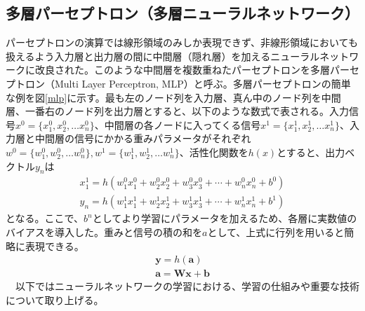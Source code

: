 \subsection{多層パーセプトロン（多層ニューラルネットワーク）}
パーセプトロンの演算では線形領域のみしか表現できず、非線形領域においても扱えるよう入力層と出力層の間に中間層（隠れ層）を加えるニューラルネットワークに改良された。このような中間層を複数重ねたパーセプトロンを多層パーセプトロン（Multi Layer Perceptron, MLP）と呼ぶ。多層パーセプトロンの簡単な例を図\ref{mlp}に示す。最も左のノード列を入力層、真ん中のノード列を中間層、一番右のノード列を出力層とすると、以下のような数式で表される。入力信号$x^0 = \{ x_1^0, x_2^0, \ldots x_n^0 \}$、中間層の各ノードに入ってくる信号$x^1 = \{ x_1^1, x_2^1, \ldots x_n^1 \}$、入力層と中間層の信号にかかる重みパラメータがそれぞれ$w^0 = \{ w_1^0, w_2^0, \ldots w_n^0 \}, w^1 = \{ w_1^1, w_2^1, \ldots w_n^1 \}$、活性化関数を$h(x)$とすると、出力ベクトル$y_n$は
\begin{align}
x_1^1 = h(w_1^0 x_1^0 + w_2^0 x_2^0 + w_3^0 x_3^0 + \cdots + w_n^0 x_n^0 + b^0)\\
y_n = h(w_1^1 x_1^1 + w_2^1 x_2^1 + w_3^1 x_3^1 + \cdots + w_n^1 x_n^1 + b^1)
\end{align}
となる。ここで、$b^n$としてより学習にパラメータを加えるため、各層に実数値のバイアスを導入した。重みと信号の積の和を$a$として、上式に行列を用いると簡略に表現できる。\\
\begin{align}
\mathbf{y} = h(\mathbf{a})\\
\mathbf{a} = \mathbf{W} \mathbf{x} + \mathbf{b}
\end{align}
　以下ではニューラルネットワークの学習における、学習の仕組みや重要な技術について取り上げる。
